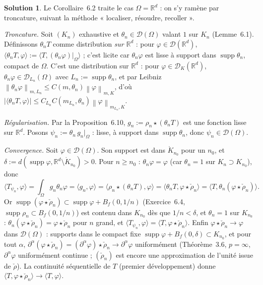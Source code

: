 \documentclass[11pt,a4paper]{article}
\newcommand{\R}{\mathbb{R}}
\newcommand{\interieur}[1]{\mathring{#1}}
\newcommand{\Bf}{B_f}
\newcommand{\norm}[1]{\left\|#1\right\|}
\DeclareMathOperator{\supp}{supp}
\newcommand{\D}{\mathcal{D}}
\theoremstyle{definition}
\newtheorem*{solution}{Solution}
\begin{document}
\begin{solution}
Le Corollaire~6.2 traite le cas $\Omega=\R^d$ : on s'y ramène par troncature, suivant la méthode « localiser, résoudre, recoller ».

\emph{Troncature.} Soit $(K_n)$ exhaustive et $\theta_n\in\D(\Omega)$ valant $1$ sur $K_n$ (Lemme~6.1). Définissons $\theta_nT$ comme distribution \emph{sur $\R^d$} : pour $\varphi\in\D(\R^d)$, $\langle\theta_nT,\varphi\rangle:=\langle T,(\theta_n\varphi)|_\Omega\rangle$ ; c'est licite car $\theta_n\varphi$ est lisse à support dans $\supp\theta_n$, compact de $\Omega$. C'est une distribution sur $\R^d$ : pour $\varphi\in\D_K(\R^d)$, $\theta_n\varphi\in\D_{L_n}(\Omega)$ avec $L_n:=\supp\theta_n$, et par Leibniz $\norm{\theta_n\varphi}_{m,L_n}\le C(m,\theta_n)\norm\varphi_{m,K}$, d'où $|\langle\theta_nT,\varphi\rangle|\le C_{L_n}C(m_{L_n},\theta_n)\norm\varphi_{m_{L_n},K}$.

\emph{Régularisation.} Par la Proposition~6.10, $g_n:=\rho_n\star(\theta_nT)$ est une fonction lisse sur $\R^d$. Posons $\psi_n:=\theta_n\,g_n|_\Omega$ : lisse, à support dans $\supp\theta_n$, donc $\psi_n\in\D(\Omega)$.

\emph{Convergence.} Soit $\varphi\in\D(\Omega)$. Son support est dans $\interieur K_{n_0}$ pour un $n_0$, et $\delta:=d(\supp\varphi,\R^d\setminus\interieur K_{n_0})>0$. Pour $n\ge n_0$ : $\theta_n\varphi=\varphi$ (car $\theta_n=1$ sur $K_n\supset K_{n_0}$), donc
\[
\langle T_{\psi_n},\varphi\rangle=\int_\Omega g_n\theta_n\varphi=\langle g_n,\varphi\rangle=\langle\rho_n\star(\theta_nT),\varphi\rangle=\langle\theta_nT,\varphi\star\check\rho_n\rangle=\langle T,\theta_n(\varphi\star\check\rho_n)\rangle .
\]
Or $\supp(\varphi\star\check\rho_n)\subset\supp\varphi+\Bf(0,1/n)$ (Exercice~6.4, $\supp\rho_n\subset\Bf(0,1/n)$) est contenu dans $K_{n_0}$ dès que $1/n<\delta$, et $\theta_n=1$ sur $K_{n_0}$ : $\theta_n(\varphi\star\check\rho_n)=\varphi\star\check\rho_n$ pour $n$ grand, et $\langle T_{\psi_n},\varphi\rangle=\langle T,\varphi\star\check\rho_n\rangle$. Enfin $\varphi\star\check\rho_n\to\varphi$ dans $\D(\Omega)$ : supports dans le compact fixe $\supp\varphi+\Bf(0,\delta)\subset K_{n_0}$, et pour tout $\alpha$, $\partial^\alpha(\varphi\star\check\rho_n)=(\partial^\alpha\varphi)\star\check\rho_n\to\partial^\alpha\varphi$ uniformément (Théorème~3.6, $p=\infty$, $\partial^\alpha\varphi$ uniformément continue ; $(\check\rho_n)$ est encore une approximation de l'unité issue de $\check\rho$). La continuité séquentielle de $T$ (premier développement) donne $\langle T,\varphi\star\check\rho_n\rangle\to\langle T,\varphi\rangle$.
\end{solution}
\end{document}
